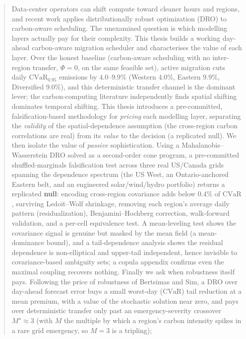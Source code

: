 \documentclass[12pt]{article}
\newcommand{\CVaR}{\mathrm{CVaR}}
\begin{document}
\begin{abstract}
\noindent Data-center operators can shift compute toward cleaner hours and regions,
and recent work applies distributionally robust optimization (DRO) to carbon-aware
scheduling. The unexamined question is which modelling layers actually pay for their
complexity. This thesis builds a working day-ahead carbon-aware migration scheduler
and characterises the value of each layer. Over the honest baseline (carbon-aware
scheduling with no inter-region transfer, $\Phi=0$, on the same feasible set), active
migration cuts daily $\CVaR_{0.95}$ emissions by $4.0$--$9.9\%$ (Western $4.0\%$, Eastern $9.9\%$, Diversified $9.0\%$), and this deterministic transfer channel is the
dominant lever; the carbon-computing literature independently finds spatial shifting
dominates temporal shifting. This thesis introduces a pre-committed,
falsification-based methodology for \emph{pricing} each modelling layer, separating the
\emph{validity} of the spatial-dependence assumption (the cross-region carbon
correlations are real) from its \emph{value} to the decision (a replicated null). We
then isolate the value of \emph{passive}
sophistication. Using a Mahalanobis--Wasserstein DRO solved as a second-order cone
program, a pre-committed shuffled-marginals falsification test across three real
US/Canada grids spanning the dependence spectrum (the US West, an Ontario-anchored
Eastern belt, and an engineered solar/wind/hydro portfolio) returns a replicated
\textbf{null}: encoding cross-region covariance adds below
$0.4\%$ of $\CVaR$, surviving Ledoit--Wolf shrinkage, removing each region's average
daily pattern (residualization),
Benjamini--Hochberg correction, walk-forward validation, and a per-cell equivalence
test. A mean-leveling test shows the covariance signal is genuine but masked by the mean
field (a mean-dominance bound), and a tail-dependence analysis shows the residual
dependence is non-elliptical and upper-tail independent, hence invisible to
covariance-based ambiguity sets; a copula appendix confirms even the maximal coupling
recovers nothing. Finally we ask when robustness itself pays. Following the price of
robustness of Bertsimas and Sim, a DRO over day-ahead forecast error buys a small
worst-day ($\CVaR$) tail reduction at a mean premium, with a value of the stochastic
solution near zero, and pays over deterministic transfer only past an
emergency-severity crossover $M^\star\approx3$ (with $M$ the multiple by which a
region's carbon intensity spikes in a rare grid emergency, so $M=3$ is a tripling);

\end{abstract}
\end{document}

